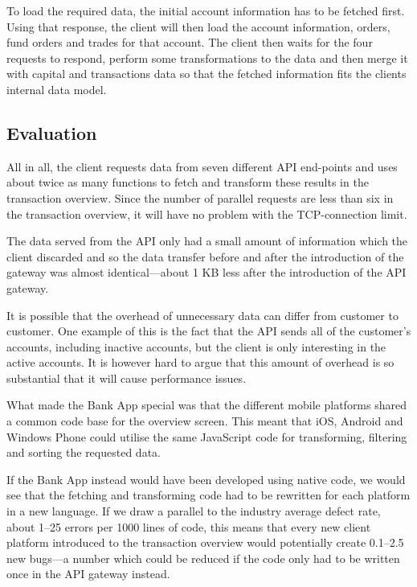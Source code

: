 \documentclass{cslthse-msc}
\begin{document}
To load the required data, the initial account information has to be fetched first. Using that response, the client will then load the account information, orders, fund orders and trades for that account. The client then waits for the four requests to respond, perform some transformations to the data and then merge it with capital and transactions data so that the fetched information fits the clients internal data model.

\subsection{Evaluation}
All in all, the client requests data from seven different API end-points and uses about twice as many functions to fetch and transform these results in the transaction overview. Since the number of parallel requests are less than six in the transaction overview, it will have no problem with the TCP-connection limit.

The data served from the API only had a small amount of information which the client discarded and so the data transfer before and after the introduction of the gateway was almost identical---about 1 KB less after the introduction of the API gateway.

It is possible that the overhead of unnecessary data can differ from customer to customer. One example of this is the fact that the API sends all of the customer's accounts, including inactive accounts, but the client is only interesting in the active accounts. It is however hard to argue that this amount of overhead is so substantial that it will cause performance issues.

What made the Bank App special was that the different mobile platforms shared a common code base for the overview screen. This meant that iOS, Android and Windows Phone could utilise the same JavaScript code for transforming, filtering and sorting the requested data.

If the Bank App instead would have been developed using native code, we would see that the fetching and transforming code had to be rewritten for each platform in a new language. If we draw a parallel to the industry average defect rate, about 1--25 errors per 1000 lines of code\cite[page 521]{code_complete}, this means that every new client platform introduced to the transaction overview would potentially create 0.1--2.5 new bugs---a number which could be reduced if the code only had to be written once in the API gateway instead.
\end{document}
